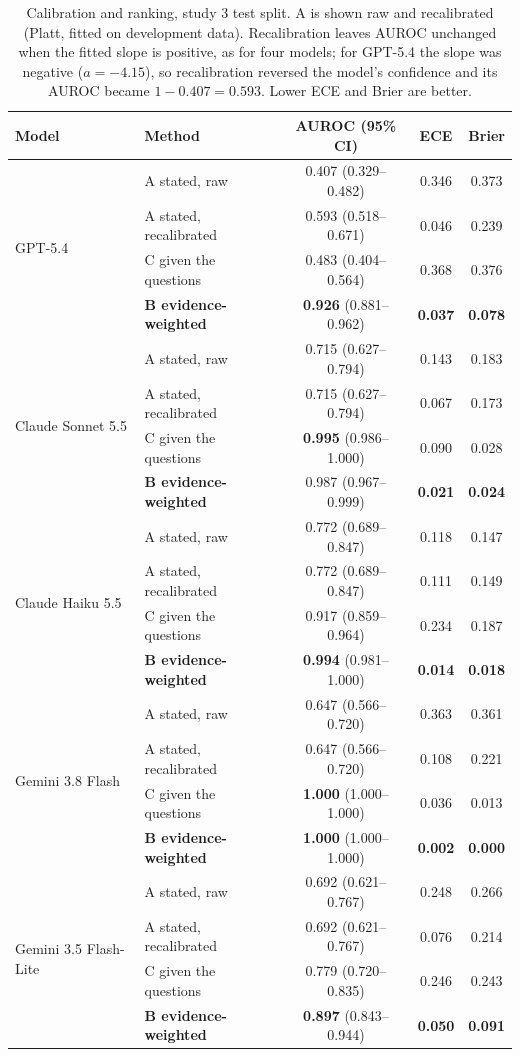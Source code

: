 \documentclass[10pt,letterpaper]{article}
\begin{document}
\begin{table}[!htbp]
\centering\small
\caption{Calibration and ranking, study 3 test split. A is shown raw and recalibrated (Platt, fitted on development data). Recalibration leaves AUROC unchanged when the fitted slope is positive, as for four models; for GPT-5.4 the slope was negative ($a=-4.15$), so recalibration reversed the model's confidence and its AUROC became $1-0.407=0.593$. Lower ECE and Brier are better.}\label{tab:main}
\begin{tabular}{@{}llccc@{}}
\toprule
Model & Method & AUROC (95\% CI) & ECE & Brier \\
\midrule
\multirow{4}{*}{GPT-5.4} & A stated, raw & 0.407 (0.329--0.482) & 0.346 & 0.373 \\
 & A stated, recalibrated & 0.593 (0.518--0.671) & 0.046 & 0.239 \\
 & C given the questions & 0.483 (0.404--0.564) & 0.368 & 0.376 \\
 & \textbf{B evidence-weighted} & \textbf{0.926} (0.881--0.962) & \textbf{0.037} & \textbf{0.078} \\
\midrule
\multirow{4}{*}{Claude Sonnet 5.5} & A stated, raw & 0.715 (0.627--0.794) & 0.143 & 0.183 \\
 & A stated, recalibrated & 0.715 (0.627--0.794) & 0.067 & 0.173 \\
 & C given the questions & \textbf{0.995} (0.986--1.000) & 0.090 & 0.028 \\
 & \textbf{B evidence-weighted} & 0.987 (0.967--0.999) & \textbf{0.021} & \textbf{0.024} \\
\midrule
\multirow{4}{*}{Claude Haiku 5.5} & A stated, raw & 0.772 (0.689--0.847) & 0.118 & 0.147 \\
 & A stated, recalibrated & 0.772 (0.689--0.847) & 0.111 & 0.149 \\
 & C given the questions & 0.917 (0.859--0.964) & 0.234 & 0.187 \\
 & \textbf{B evidence-weighted} & \textbf{0.994} (0.981--1.000) & \textbf{0.014} & \textbf{0.018} \\
\midrule
\multirow{4}{*}{Gemini 3.8 Flash} & A stated, raw & 0.647 (0.566--0.720) & 0.363 & 0.361 \\
 & A stated, recalibrated & 0.647 (0.566--0.720) & 0.108 & 0.221 \\
 & C given the questions & \textbf{1.000} (1.000--1.000) & 0.036 & 0.013 \\
 & \textbf{B evidence-weighted} & \textbf{1.000} (1.000--1.000) & \textbf{0.002} & \textbf{0.000} \\
\midrule
\multirow{4}{*}{Gemini 3.5 Flash-Lite} & A stated, raw & 0.692 (0.621--0.767) & 0.248 & 0.266 \\
 & A stated, recalibrated & 0.692 (0.621--0.767) & 0.076 & 0.214 \\
 & C given the questions & 0.779 (0.720--0.835) & 0.246 & 0.243 \\
 & \textbf{B evidence-weighted} & \textbf{0.897} (0.843--0.944) & \textbf{0.050} & \textbf{0.091} \\
\bottomrule
\end{tabular}
\end{table}
\end{document}
